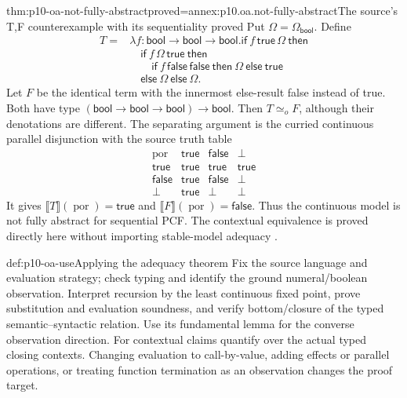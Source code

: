 \begin{hbtheorem}{thm:p10-oa-not-fully-abstract}{proved=annex:p10.oa.not-fully-abstract}{The source's T,F counterexample with its sequentiality proved}
Put \(\Omega=\Omega_{\mathsf{bool}}\). Define
\[
 \begin{split}
 T={}&\lambda f:\mathsf{bool}\to\mathsf{bool}\to\mathsf{bool}.
 \mathsf{if}\ f\,\mathsf{true}\,\Omega\ \mathsf{then}\\
 &\quad\mathsf{if}\ f\,\Omega\,\mathsf{true}\ \mathsf{then}\\
 &\qquad\mathsf{if}\ f\,\mathsf{false}\,\mathsf{false}
    \ \mathsf{then}\ \Omega\ \mathsf{else}\ \mathsf{true}\\
 &\quad\mathsf{else}\ \Omega\ \mathsf{else}\ \Omega.
 \end{split}
\]
Let \(F\) be the identical term with the innermost else-result false
instead of true. Both have type
\((\mathsf{bool}\to\mathsf{bool}\to\mathsf{bool})\to\mathsf{bool}\).
Then \(T\simeq_o F\), although their denotations are different.
The separating argument is the curried continuous parallel disjunction
with the source truth table
\[
 \begin{array}{c|ccc}
 \operatorname{por}&\mathsf{true}&\mathsf{false}&\bot\\\hline
 \mathsf{true}&\mathsf{true}&\mathsf{true}&\mathsf{true}\\
 \mathsf{false}&\mathsf{true}&\mathsf{false}&\bot\\
 \bot&\mathsf{true}&\bot&\bot
 \end{array}
\]
It gives \(\llbracket T\rrbracket(\operatorname{por})=\mathsf{true}\)
and \(\llbracket F\rrbracket(\operatorname{por})=\mathsf{false}\).
Thus the continuous model is not fully abstract for sequential PCF.
The contextual equivalence is proved directly here without importing
stable-model adequacy \cite[Tables~9--10, pp.~36--38]{Gunter1994TypesAuthorOA}
\cite[pp.~234--236]{Plotkin1977LCFAuthorOA}.
\end{hbtheorem}

\begin{hbmethod}{def:p10-oa-use}{Applying the adequacy theorem}
Fix the source language and evaluation strategy; check typing and identify
the ground numeral/boolean observation. Interpret recursion by the least
continuous fixed point, prove substitution and evaluation soundness,
and verify bottom/closure of the typed semantic--syntactic relation.
Use its fundamental lemma for the converse observation direction.
For contextual claims quantify over the actual typed closing contexts.
Changing evaluation to call-by-value, adding effects or parallel operations,
or treating function termination as an observation changes the proof target.
\end{hbmethod}

